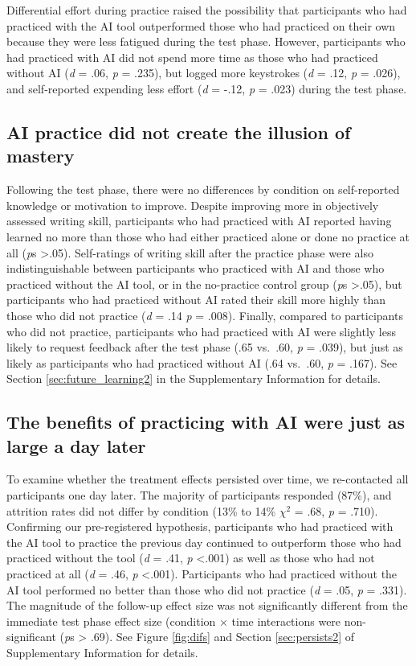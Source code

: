 \documentclass[11pt]{report}
\begin{document}
\begin{mainf}
Differential effort during practice raised the possibility that
participants who had practiced with the AI tool outperformed those who
had practiced on their own because they were less fatigued during the test
phase. However, participants who had practiced with AI did not spend more 
time as those who had practiced without AI (\emph{d} = .06, \emph{p} =
.235), but logged more keystrokes (\emph{d} = .12, \emph{p} = .026), and
self-reported expending less effort (\emph{d} = -.12, \emph{p} = .023)
during the test phase.

\subsection*{AI practice did not create the illusion of mastery}
Following the test phase, there were no differences by condition on
self-reported knowledge or motivation to improve. Despite improving more in objectively assessed writing skill, participants who had practiced with
AI reported having learned no more than those who had either
practiced alone or done no practice at all (\textit{p}s
\textgreater .05). Self-ratings of writing skill after the practice
phase were also indistinguishable between participants who practiced
with AI and those who practiced without the AI tool, or in the
no-practice control group (\textit{p}s \textgreater .05), but
participants who had practiced without AI rated their skill more highly
than those who did not practice (\emph{d} = .14 \emph{p} = .008).
Finally, compared to participants who did not practice, participants who had
practiced with AI were slightly less likely to request feedback after
the test phase (.65 vs.~.60, \textit{p} = .039), but just as likely as
participants who had practiced without AI (.64 vs.~.60, \textit{p} = .167).
See Section \ref{sec:future_learning2} in the Supplementary Information
for details.

\subsection*{The benefits of practicing with AI were just as large a day later}
To examine whether the treatment effects persisted over time, we re-contacted all
participants one day later. The majority of participants responded
(87\%), and attrition rates did not differ by condition (13\% to
14\% \(\chi^2\) = .68, \textit{p} = .710). Confirming our pre-registered
hypothesis, participants who had practiced with the AI tool to practice the
previous day continued to outperform those who had practiced without the
tool (\emph{d} = .41, \emph{p} \textless.001) as well as those who had
not practiced at all (\emph{d} = .46, \emph{p} \textless.001).
Participants who had practiced without the AI tool performed no better
than those who did not practice (\emph{d} = .05, \emph{p} = .331). 
The magnitude of the follow-up effect size was not significantly different from the immediate test phase effect size (condition $\times$ time interactions were non-significant (\textit{p}s > .69).
See Figure \ref{fig:difs} and Section \ref{sec:persists2} of Supplementary Information for details.


\end{mainf}
\end{document}
